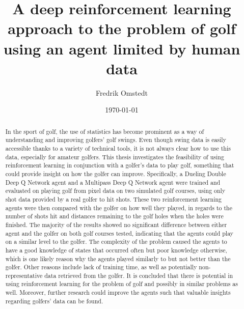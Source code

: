 \documentclass{kththesis}
\title{A deep reinforcement learning approach to the problem of golf using an agent limited by human data}
\author{Fredrik Omstedt}
\date{\today}
\begin{document}
\frontmatter

\titlepage

\begin{abstract}
In the sport of golf, the use of statistics has become prominent as a way of understanding and improving golfers' golf swings. Even though swing data is easily accessible thanks to a variety of technical tools, it is not always clear how to use this data, especially for amateur golfers. This thesis investigates the feasibility of using reinforcement learning in conjunction with a golfer's data to play golf, something that could provide insight on how the golfer can improve. Specifically, a Dueling Double Deep Q Network agent and a Multipass Deep Q Network agent were trained and evaluated on playing golf from pixel data on two simulated golf courses, using only shot data provided by a real golfer to hit shots. These two reinforcement learning agents were then compared with the golfer on how well they played, in regards to the number of shots hit and distances remaining to the golf holes when the holes were finished. The majority of the results showed no significant difference between either agent and the golfer on both golf courses tested, indicating that the agents could play on a similar level to the golfer. The complexity of the problem caused the agents to have a good knowledge of states that occurred often but poor knowledge otherwise, which is one likely reason why the agents played similarly to but not better than the golfer. Other reasons include lack of training time, as well as potentially non-representative data retrieved from the golfer. It is concluded that there is potential in using reinforcement learning for the problem of golf and possibly in similar problems as well. Moreover, further research could improve the agents such that valuable insights regarding golfers' data can be found.
\end{abstract}
\end{document}
